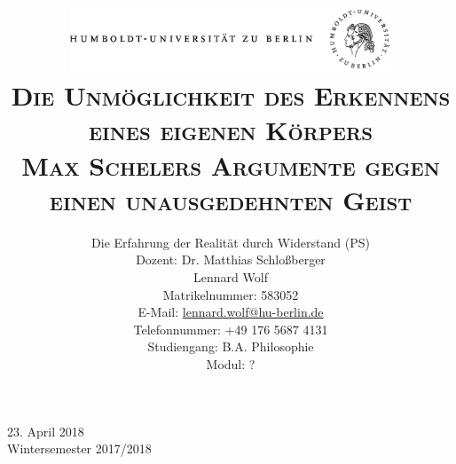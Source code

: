 \documentclass[a4paper, 12pt]{article}
\date{\vspace{-3ex}}
\begin{document}
\title{\vspace{5ex}
	\includegraphics*[bb=0 0 720 200, width=0.72\textwidth]{ErstesSem/images/hu_logo.png}\\
	\vspace{30pt}
	\scshape\LARGE{Die Unmöglichkeit des Erkennens\\eines eigenen Körpers
}\\\vspace{5pt}\Large{Max Schelers Argumente gegen einen unausgedehnten Geist}\\\vspace{20pt}}
	


\author{Die Erfahrung der Realität durch Widerstand (PS)\\
	\vspace{7pt}
          Dozent: Dr. Matthias Schloßberger\\\vspace{4pt}Lennard Wolf\\
        \small{Matrikelnummer: 583052}\\
        \small{E-Mail: \href{mailto:lennard.wolf@hu-berlin.de}{lennard.wolf@hu-berlin.de}}\\
        \small{Telefonnummer: +49 176 5687 4131}\\
        \small{Studiengang: B.A. Philosophie}\\
        \small{Modul: ?}}

\maketitle

\vspace{\fill}

\begin{minipage}[]{0.92\textwidth}
    \centering
    \onehalfspacing
    \large   
    23. April 2018\\
    Wintersemester 2017/2018

    \vspace{-20mm} 
\end{minipage}%
\thispagestyle{empty}
\newpage
\setcounter{page}{1}
\end{document}
